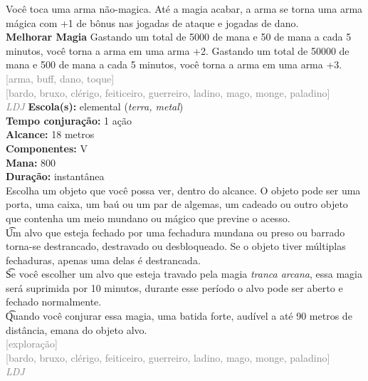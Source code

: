 \documentclass{RPG_Adventure}[2021/10/20]
\begin{document}
{\normalsize Você toca uma arma não-magica. Até a magia acabar, a arma se torna uma arma mágica com +1 de bônus nas jogadas de ataque e jogadas de dano.\\\t \textbf{Melhorar Magia} Gastando um total de 5000 de mana e 50 de mana a cada 5 minutos, você torna a arma em uma arma +2. Gastando um total de 50000 de mana e 500 de mana a cada 5 minutos, você torna a arma em uma arma +3.\\}
{\scriptsize \textcolor{gray}{[arma, buff, dano, toque]\\}}
{\scriptsize \textcolor{gray}{[bardo, bruxo, clérigo, feiticeiro, guerreiro, ladino, mago, monge, paladino]\\}}
{\tiny \textcolor{gray}{\textit{LDJ}}}
{\small \t \textbf{Escola(s):} elemental (\textit{terra, metal})\\\t \textbf{Tempo conjuração:} 1 ação\\\t \textbf{Alcance:} 18 metros\\\t \textbf{Componentes:} V\\\t \textbf{Mana:} 800\\\t \textbf{Duração:} instantânea\\}
{\normalsize Escolha um objeto que você possa ver, dentro do alcance. O objeto pode ser uma porta, uma caixa, um baú ou um par de algemas, um cadeado ou outro objeto que contenha um meio mundano ou mágico que previne o acesso.\\\t Um alvo que esteja fechado por uma fechadura mundana ou preso ou barrado torna-se destrancado, destravado ou desbloqueado. Se o objeto tiver múltiplas fechaduras, apenas uma delas é destrancada.\\\t Se você escolher um alvo que esteja travado pela magia \textit{tranca arcana}, essa magia será suprimida por 10 minutos, durante esse período o alvo pode ser aberto e fechado normalmente.\\\t Quando você conjurar essa magia, uma batida forte, audível a até 90 metros de distância, emana do objeto alvo.\\}
{\scriptsize \textcolor{gray}{[exploração]\\}}
{\scriptsize \textcolor{gray}{[bardo, bruxo, clérigo, feiticeiro, guerreiro, ladino, mago, monge, paladino]\\}}
{\tiny \textcolor{gray}{\textit{LDJ}}}
\end{document}
